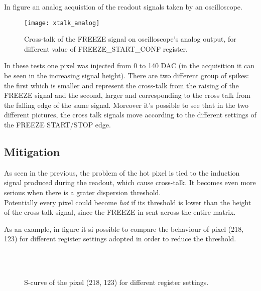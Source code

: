 In figure  an analog acquistion of the readout signals taken by an oscilloscope.


\begin{figure}
\centering
\texttt{[image: xtalk\_analog]}
\caption{Cross-talk of the \textsc{FREEZE} signal on oscilloscope's analog output, for different value of \textsc{FREEZE\_START\_CONF} register.}
\label{fig:analog_xtalk}
\end{figure}

In these tests one pixel was injected from 0 to 140 DAC (in the acquisition it can be seen in the increasing signal height). There are two different group of spikes: the first which is smaller and represent the cross-talk from the raising of the \textsc{FREEZE} signal and the second, larger and corresponding to the cross talk from the falling edge of the same signal.
Moreover it's possible to see that in the two different pictures, the cross talk signals move according to the different settings of the \textsc{FREEZE START/STOP} edge.



\subsection{Mitigation}

As seen in the previous, the problem of the hot pixel is tied to the induction signal produced during the readout, which cause cross-talk. It becomes even more serious when there is a grater dispersion threshold.\\

Potentially every pixel could become \textit{hot} if its threshold is lower than the height of the cross-talk signal, since the \textsc{FREEZE} in sent across the entire matrix. 

As an example, in figure  it si possible to compare the behaviour of pixel (218, 123) for different register settings adopted in order to reduce the threshold.

\begin{figure}[h!]
\centering
{}\quad
{}\\
\\
\caption{S-curve of the pixel (218, 123) for different register settings.}
\label{fig:making_hot}
\end{figure}

